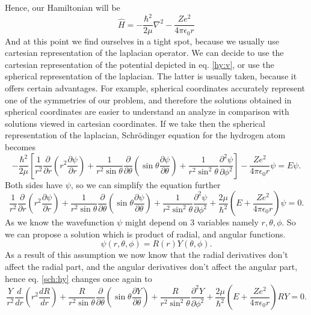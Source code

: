 \begin{questions}
\begin{solution}
  Hence, our Hamiltonian will be
  \begin{equation}
    \hat{H} = -\frac{\hbar^2}{2\mu}\nabla^2 - \frac{Ze^2}{4\pi\epsilon_0r}
  \end{equation}
  And at this point we find ourselves in a tight spot, because we usually use cartesian representation of the laplacian operator. We can decide to use the cartesian representation of the potential depicted in eq. \ref{hy:v}, or use the spherical representation of the laplacian. The latter is usually taken, because it offers certain advantages. For example, spherical coordinates accurately represent one of the symmetries of our problem, and therefore the solutions obtained in spherical coordinates are easier to understand an analyze in comparison with solutions viewed in cartesian coordinates. If we take then the spherical representation of the laplacian, Schrödinger equation for the hydrogen atom becomes
  \begin{equation*}
    -\frac{\hbar^2}{2\mu} \left[ \frac{1}{r^2} \frac{\partial}{\partial r} \left(r^2\frac{\partial \psi}{\partial r}\right) + \frac{1}{r^2 \sin{\theta}}\frac{\partial}{\partial \theta}\left(\sin{\theta}\frac{\partial \psi}{\partial \theta}\right) + \frac{1}{r^2\sin^2{\theta}}\frac{\partial^2 \psi}{\partial \phi^2}\right] - \frac{Ze^2}{4\pi\epsilon_0r} \psi = E\psi.
  \end{equation*}
  Both sides have $\psi$, so we can simplify the equation further
  \begin{equation}
    \frac{1}{r^2} \frac{\partial}{\partial r} \left(r^2\frac{\partial \psi}{\partial r}\right) + \frac{1}{r^2 \sin{\theta}}\frac{\partial}{\partial \theta}\left(\sin{\theta}\frac{\partial \psi}{\partial \theta}\right) + \frac{1}{r^2\sin^2{\theta}}\frac{\partial^2 \psi}{\partial \phi^2} + \frac{2\mu}{\hbar^2}\left(E + \frac{Ze^2}{4\pi\epsilon_0r} \right)\psi = 0.
    \label{sch:hy}
  \end{equation}
  As we know the wavefunction $\psi$ might depend on 3 variables namely $r,\theta,\phi$. So we can propose a solution which is product of radial, and angular functions.
  \begin{equation*}
    \psi(r,\theta,\phi) = R(r)Y(\theta,\phi).
  \end{equation*}
  As a result of this assumption we now know that the radial derivatives don't affect the radial part, and the angular derivatives don't affect the angular part, hence eq. \ref{sch:hy} changes once again to
  \begin{equation*}
    \frac{Y}{r^2} \frac{d}{d r} \left(r^2\frac{d R}{d r}\right) + \frac{R}{r^2 \sin{\theta}}\frac{\partial}{\partial \theta}\left(\sin{\theta}\frac{\partial Y}{\partial \theta}\right) + \frac{R}{r^2\sin^2{\theta}}\frac{\partial^2 Y}{\partial \phi^2} + \frac{2\mu}{\hbar^2}\left(E + \frac{Ze^2}{4\pi\epsilon_0r} \right)RY = 0.

\end{equation*}
\end{solution}
\end{questions}
